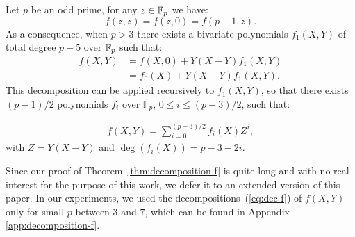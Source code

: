   \begin{theorem}\label{thm:decomposition-f}
    Let $p$ be an odd prime, for any $z\in\mathbb{F}_p$ we have:
    \begin{equation}
      \label{eq:3}
       f(z,z) = f(z,0) = f(p-1,z).
    \end{equation}
    As a consequence, when $p>3$ there exists a bivariate polynomials $f_1(X,Y)$ of total degree $p-5$ over $\mathbb{F}_p$ such that:
    \begin{align}
      \label{eq:dec-f}
      f(X,Y) &= f(X,0) + Y(X-Y)f_1(X,Y) \nonumber \\
      &= f_0(X) + Y(X-Y)f_1(X,Y).
    \end{align}   
    This decomposition can be applied recursively to $f_1(X,Y)$, so that there exists $(p-1)/2$ polynomials $f_i$ over $\mathbb{F}_p$, $0\leq i \leq (p-3)/2$, such that:

    \begin{align}\label{eq:decomposition-f-final}
      f(X,Y) = \sum_{i=0}^{(p-3)/2} f_i(X)Z^i,
    \end{align}
    with $Z=Y(X-Y)$ and $\deg (f_{i}(X)) = p-3 - 2i$.

  \end{theorem}  

  Since our proof of Theorem~\ref{thm:decomposition-f} is quite long and with no real interest for the purpose of this work, we defer it to an extended version of this paper. 
  In our experiments, we used the decompositions~(\ref{eq:dec-f}) of $f(X,Y)$ only for small $p$ between $3$ and $7$, which can be found in Appendix \ref{app:decomposition-f}.\newline
  



